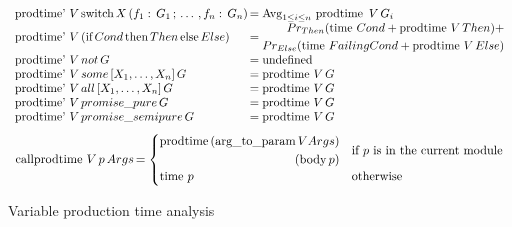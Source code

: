 \begin{algorithm}
\[\begin{array}{l @{}l @{}l}
\prodtimep V\,& \hbox{switch}\,X\,(f_1:\,G_1\,;\,\ldots\,,f_n:\,G_n)\, &=
    \Avg_{1 \leq i \leq n}\,\prodtime\,V\,G_i \\
\prodtimep V\,& (\hbox{if}\,Cond\,\hbox{then}\,Then\,\hbox{else}\,Else) &=
        \begin{split}
            Pr_{Then}(\timef Cond + \prodtime V\,Then) + \\
            Pr_{Else}(\timef FailingCond + \prodtime V\,Else)
        \end{split} \\
\prodtimep V\,& not\,G                       &= \undef \\
\prodtimep V\,& some\,[X_1,\ldots,X_n]\,G    &= \prodtime V\,G \\
\prodtimep V\,& all\,[X_1,\ldots,X_n]\,G     &= \prodtime V\,G \\
\prodtimep V\,& promise\_pure\,G             &= \prodtime V\,G \\
\prodtimep V\,& promise\_semipure\,G         &= \prodtime V\,G \\
\end{array}
\]
\[
\begin{array}{l @{}l}
\callprodtime V\,p\,Args        \,&=
    \begin{cases}
        \begin{split}
            \prodtime (\operatorname{arg\_to\_param} V Args) \\
            (\operatorname{body} p)
        \end{split} &
            \text{if } p \text{ is in the current module} \\
        \timef p &
            \text{otherwise}
    \end{cases} \\
\end{array}
\]
\caption{Variable production time analysis}
\label{alg:var_prod_time}
\end{algorithm}

